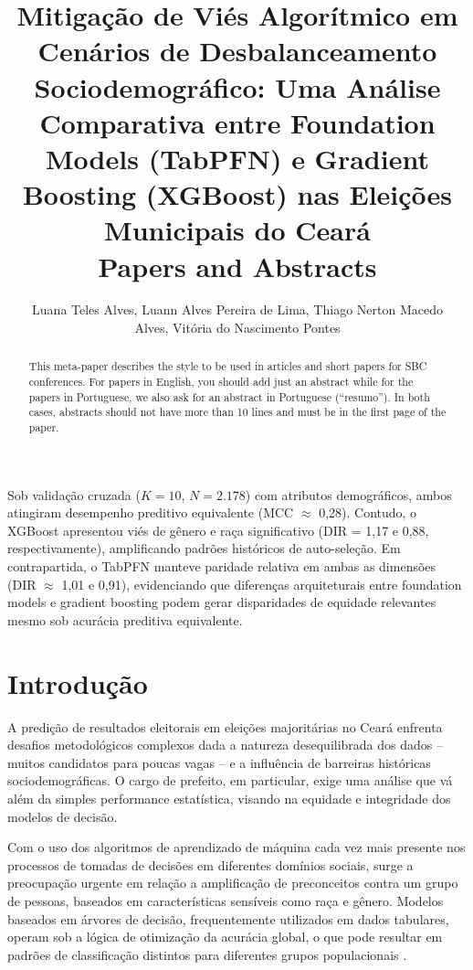 \documentclass[12pt]{article}
\title{Mitigação de Viés Algorítmico em Cenários de Desbalanceamento Sociodemográfico: Uma Análise Comparativa entre Foundation Models (TabPFN) e Gradient Boosting (XGBoost) nas Eleições Municipais do Ceará\\ Papers and Abstracts}
\author{Luana Teles Alves\inst{1}, Luann Alves Pereira de Lima\inst{1}, Thiago Nerton Macedo\\ 
  Alves\inst{1}, Vitória do Nascimento Pontes\inst{1} }
\begin{document}
 

\maketitle

\begin{abstract}
  This meta-paper describes the style to be used in articles and short papers
  for SBC conferences. For papers in English, you should add just an abstract
  while for the papers in Portuguese, we also ask for an abstract in
  Portuguese (``resumo''). In both cases, abstracts should not have more than
  10 lines and must be in the first page of the paper.
\end{abstract}
     
\begin{resumo} 
  Sob validação cruzada ($K=10$, $N=2.178$) com atributos demográficos, ambos
  atingiram desempenho preditivo equivalente (MCC $\approx$ 0,28). Contudo, o
  XGBoost apresentou viés de gênero e raça significativo (DIR = 1,17 e 0,88,
  respectivamente), amplificando padrões históricos de auto-seleção. Em
  contrapartida, o TabPFN manteve paridade relativa em ambas as dimensões
  (DIR $\approx$ 1,01 e 0,91), evidenciando que diferenças arquiteturais entre
  foundation models e gradient boosting podem gerar disparidades de equidade
  relevantes mesmo sob acurácia preditiva equivalente.
\end{resumo}


\section{Introdução}

A predição de resultados eleitorais em eleições majoritárias no Ceará enfrenta desafios
metodológicos complexos dada a natureza desequilibrada dos dados – muitos candidatos para
poucas vagas – e a influência de barreiras históricas sociodemográficas. O cargo de
prefeito, em particular, exige uma análise que vá além da simples performance estatística,
visando na equidade e integridade dos modelos de decisão.

Com o  uso dos algoritmos de aprendizado de máquina cada vez mais presente nos processos de 
tomadas de decisões em diferentes domínios sociais, surge a preocupação urgente em relação a
amplificação de preconceitos contra um grupo de pessoas, baseados em características sensíveis
como raça e gênero. Modelos baseados em árvores de decisão, frequentemente utilizados em
dados tabulares, operam sob a lógica de otimização da acurácia global, o que pode resultar
em padrões de classificação distintos para diferentes grupos populacionais \cite{grari:2020}. 
\end{document}
